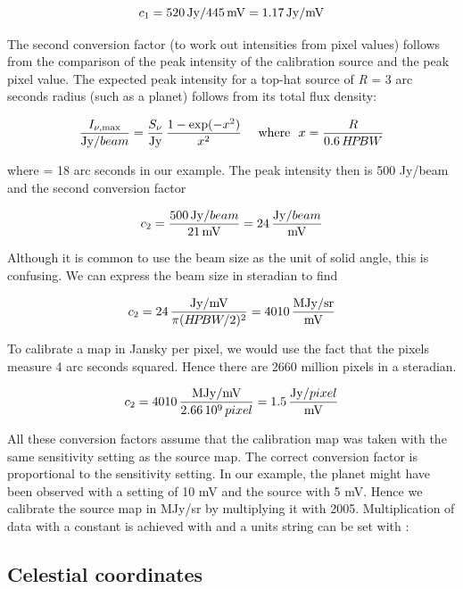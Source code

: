 \documentclass[11pt,noabs]{starlink}
\begin{document}
\[c_1 = 520\,{\rm Jy} / 445\,{\rm mV} = 1.17\,{\rm Jy/mV}\]

   The second conversion factor (to work out intensities from pixel
   values) follows from the comparison of the peak intensity of the
   calibration source and the peak pixel value. The expected peak
   intensity for a top-hat source of \textit{R\/} = 3 arc seconds radius
   (such as a planet) follows from its total flux density:

\[{I_{\nu,\rm max} \over {\rm Jy}/beam}
    = {S_{\nu} \over {\rm Jy}}
    \, {1 - \exp(-x^2) \over x^2}
\mbox{\ \ \ \ where\ \ }
  x = {R \over 0.6\,H\!P\!BW}\]

   where
   = 18 arc seconds in our example. The peak intensity then is 500
   Jy/beam and the second conversion factor

\[c_2 = {500\,{\rm Jy}/beam \over 21\,{\rm mV}}
      =  24\,{{\rm Jy}/beam \over     {\rm mV}}\]

   Although it is common to use the beam size as the unit of solid
   angle, this is confusing. We can express the beam size in steradian
   to find

\[c_2 =  24\,{{\rm Jy/mV} \over \pi (H\!P\!BW/2)^2}
      = 4010\,{\rm MJy/sr \over mV}\]

   To calibrate a map in Jansky per pixel, we would use the fact that
   the pixels measure 4 arc seconds squared. Hence there are 2660
   million pixels in a steradian.

\[c_2 = 4010\,{{\rm MJy/mV}   \over 2.66\,10^9\,pixel}
      =  1.5\,{{\rm Jy}/pixel \over {\rm mV}}\]

   All these conversion factors assume that the calibration map was
   taken with the same sensitivity setting as the source map. The
   correct conversion factor is proportional to the sensitivity
   setting. In our example, the planet might have been observed with a
   setting of 10 mV and the source with 5 mV. Hence we calibrate the
   source map in MJy/sr by multiplying it with 2005.
   Multiplication of data with a constant is achieved with
\texttt{}
   and a units string can be set with
\texttt{}:

\begin{terminalv}
\end{terminalv}

\subsection{\label{ae2rd}Celestial coordinates}
\end{document}

